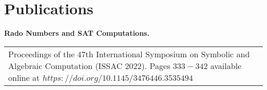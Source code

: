 \section{\sc Publications}
{\bf{Rado Numbers and SAT Computations.}}\\
\begin{tabular}{@{}p{4in}p{2in}}
Proceedings of the 47th International Symposium on Symbolic and Algebraic Computation (ISSAC 2022). Pages $333-342$ available online at $https://doi.org/10.1145/3476446.3535494$
\end{tabular}
\endinput